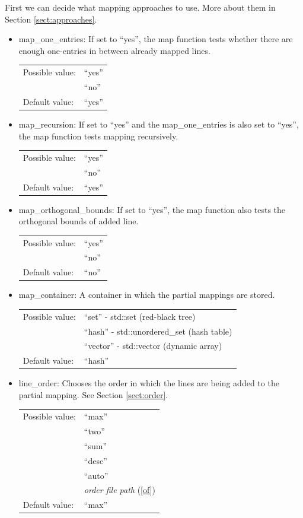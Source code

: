 First we can decide what mapping approaches to use. More about them in Section \ref{sect:approaches}.
\begin{itemize}
\item map\_one\_entries: If set to ``yes'', the map function tests whether there are enough one-entries in between already mapped lines.

\begin{tabular}{ll}
Possible value: & ``yes'' \\
& ``no'' \\
Default value: & ``yes''
\end{tabular}

\item map\_recursion: If set to ``yes'' and the map\_one\_entries is also set to ``yes'', the map function tests mapping recursively.

\begin{tabular}{ll}
Possible value: & ``yes'' \\
& ``no'' \\
Default value: & ``yes''
\end{tabular}

\item map\_orthogonal\_bounds: If set to ``yes'', the map function also tests the orthogonal bounds of added line.

\begin{tabular}{ll}
Possible value: & ``yes'' \\
& ``no'' \\
Default value: & ``no''
\end{tabular}
\end{itemize}

\begin{itemize}
\item map\_container: A container in which the partial mappings are stored.

\begin{tabular}{ll}
Possible value: & ``set'' - std::set (red-black tree) \\
& ``hash'' - std::unordered\_set (hash table) \\
& ``vector'' - std::vector (dynamic array) \\
Default value: & ``hash''
\end{tabular}

\item line\_order: Chooses the order in which the lines are being added to the partial mapping. See Section \ref{sect:order}.

\begin{tabular}{ll}
Possible value: & ``max'' \\
& ``two'' \\
& ``sum'' \\
& ``desc'' \\
& ``auto'' \\
& \textit{order file path} (\ref{of}) \\
Default value: & ``max''
\end{tabular}

\end{itemize}
